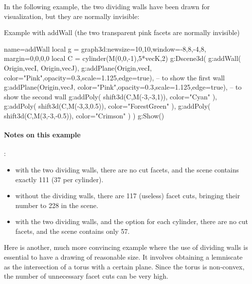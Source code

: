 In the following example, the two dividing walls have been drawn for visualization, but they are normally invisible:
\begin{demo}{Example with addWall (the two transparent pink facets are normally invisible)}
\begin{luadraw}{name=addWall}
local g = graph3d:new{size={10,10},window={-8,8,-4,8}, margin={0,0,0,0}}
local C = cylinder(M(0,0,-1),5*vecK,2)
g:Dscene3d(
    g:addWall( {{Origin,vecI}, {Origin,vecJ}}),
    g:addPlane({Origin,vecI}, {color="Pink",opacity=0.3,scale=1.125,edge=true}), -- to show the first wall
    g:addPlane({Origin,vecJ}, {color="Pink",opacity=0.3,scale=1.125,edge=true}), -- to show the second wall
    g:addPoly( shift3d(C,M(-3,-3,1)), {color="Cyan"} ),
    g:addPoly( shift3d(C,M(-3,3,0.5)), {color="ForestGreen"} ),
    g:addPoly( shift3d(C,M(3,-3,-0.5)), {color="Crimson"} )
)
g:Show()
\end{luadraw}
\end{demo}

\paragraph{Notes on this example}:
\begin{itemize}
    \item with the two dividing walls, there are no cut facets, and the scene contains exactly 111 (37 per cylinder).
    \item without the dividing walls, there are 117 (useless) facet cuts, bringing their number to 228 in the scene.
    \item with the two dividing walls, and the  option for each cylinder, there are no cut facets, and the scene contains only 57.
\end{itemize}

Here is another, much more convincing example where the use of dividing walls is essential to have a drawing of reasonable size. It involves obtaining a lemniscate as the intersection of a torus with a certain plane. Since the torus is non-convex, the number of unnecessary facet cuts can be very high.

